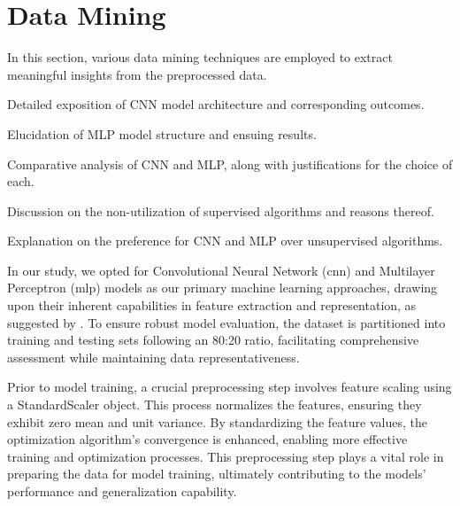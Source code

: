 \section{Data Mining}\label{data_mining}

In this section, various data mining techniques are employed to extract meaningful insights from the preprocessed data.

\begin{description}[style=nextline]
    \item[Convolution Neural Network (CNN):] Detailed exposition of CNN model architecture and corresponding outcomes.
    \item[Multilayer Perceptron (MLP):] Elucidation of MLP model structure and ensuing results.
    \item[Comparison Between CNN and MLP:] Comparative analysis of CNN and MLP, along with justifications for the choice of each.
    \item[Supervised Machine Learning Algorithms:] Discussion on the non-utilization of supervised algorithms and reasons thereof.
    \item[Unsupervised Machine Learning Algorithms:] Explanation on the preference for CNN and MLP over unsupervised algorithms.
\end{description}



In our study, we opted for Convolutional Neural Network (\gls{cnn}) and Multilayer Perceptron (\gls{mlp}) models as our primary machine learning approaches, drawing upon their inherent capabilities in feature extraction and representation, as suggested by \cite{jiang_uwb_2020}. To ensure robust model evaluation, the dataset is partitioned into training and testing sets following an 80:20 ratio, facilitating comprehensive assessment while maintaining data representativeness.

Prior to model training, a crucial preprocessing step involves feature scaling using a StandardScaler object. This process normalizes the features, ensuring they exhibit zero mean and unit variance. By standardizing the feature values, the optimization algorithm's convergence is enhanced, enabling more effective training and optimization processes. This preprocessing step plays a vital role in preparing the data for model training, ultimately contributing to the models' performance and generalization capability.




